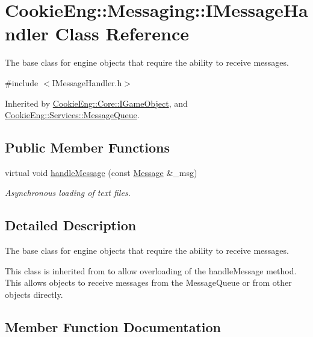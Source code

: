 \hypertarget{class_cookie_eng_1_1_messaging_1_1_i_message_handler}{}\section{Cookie\+Eng\+:\+:Messaging\+:\+:I\+Message\+Handler Class Reference}
\label{class_cookie_eng_1_1_messaging_1_1_i_message_handler}


The base class for engine objects that require the ability to receive messages.  




{\ttfamily \#include $<$I\+Message\+Handler.\+h$>$}



Inherited by \hyperlink{class_cookie_eng_1_1_core_1_1_i_game_object}{Cookie\+Eng\+::\+Core\+::\+I\+Game\+Object}, and \hyperlink{class_cookie_eng_1_1_services_1_1_message_queue}{Cookie\+Eng\+::\+Services\+::\+Message\+Queue}.

\subsection*{Public Member Functions}
\begin{DoxyCompactItemize}
\item 
virtual void \hyperlink{class_cookie_eng_1_1_messaging_1_1_i_message_handler_a4da863b449970f8195d3c60c83c6d183}{handle\+Message} (const \hyperlink{class_cookie_eng_1_1_messaging_1_1_message}{Message} \&\+\_\+msg)
\begin{DoxyCompactList}\small\item\em Asynchronous loading of text files. \end{DoxyCompactList}\end{DoxyCompactItemize}


\subsection{Detailed Description}
The base class for engine objects that require the ability to receive messages. 

This class is inherited from to allow overloading of the handle\+Message method. This allows objects to receive messages from the Message\+Queue or from other objects directly. 

\subsection{Member Function Documentation}
\mbox{\label{class_cookie_eng_1_1_messaging_1_1_i_message_handler_a4da863b449970f8195d3c60c83c6d183}} 
